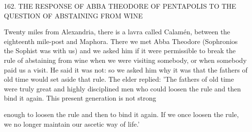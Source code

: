 162. THE RESPONSE OF ABBA THEODORE
OF PENTAPOLIS TO THE QUESTION
OF ABSTAINING FROM WINE

Twenty miles from Alexandria, there is a lavra called Calamén,
between the eighteenth mile-post and Maphora. There we met Abba
Theodore (Sophronios the Sophist was with us) and we asked him
if it were permissible to break the rule of abstaining from wine when
we were visiting somebody, or when somebody paid us a visit. He
said it was not: so we asked him why it was that the fathers of old
time would set aside that rule. The elder replied: 'The fathers of old
time were truly great and highly disciplined men who could loosen
the rule and then bind it again. This present generation is not strong

enough to loosen the rule and then to bind it again. If we once
loosen the rule, we no longer maintain our ascetic way of life.'

